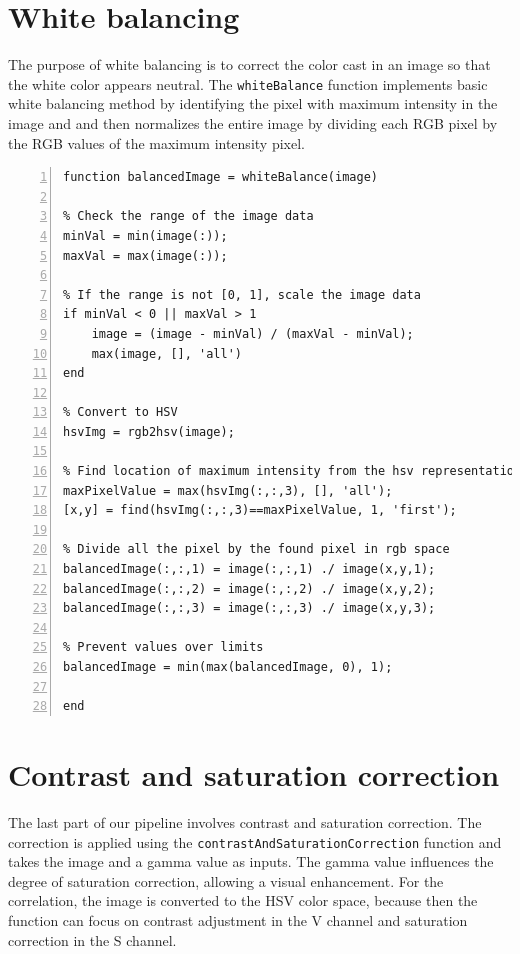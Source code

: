 \documentclass[12pt,a4paper,english
]{tunithesis}
\begin{document}
\section{White balancing}
The purpose of white balancing is to correct the color cast in an image so that the white color appears neutral. The \texttt{whiteBalance} function implements basic white balancing method by identifying the pixel with maximum intensity in the image and and then normalizes the entire image by dividing each RGB pixel by the RGB values of the maximum intensity pixel. 
\begin{lstlisting}[style=Matlab-editor, numbers=left, basicstyle=\small]
function balancedImage = whiteBalance(image)

% Check the range of the image data
minVal = min(image(:));
maxVal = max(image(:));

% If the range is not [0, 1], scale the image data
if minVal < 0 || maxVal > 1
    image = (image - minVal) / (maxVal - minVal);
    max(image, [], 'all')
end

% Convert to HSV
hsvImg = rgb2hsv(image);

% Find location of maximum intensity from the hsv representation
maxPixelValue = max(hsvImg(:,:,3), [], 'all');
[x,y] = find(hsvImg(:,:,3)==maxPixelValue, 1, 'first');

% Divide all the pixel by the found pixel in rgb space
balancedImage(:,:,1) = image(:,:,1) ./ image(x,y,1);
balancedImage(:,:,2) = image(:,:,2) ./ image(x,y,2);
balancedImage(:,:,3) = image(:,:,3) ./ image(x,y,3);

% Prevent values over limits
balancedImage = min(max(balancedImage, 0), 1);

end
\end{lstlisting}

\section{Contrast and saturation correction}
The last part of our pipeline involves contrast and saturation correction. The correction is applied using the \texttt{contrastAndSaturationCorrection} function and takes the image and a gamma value as inputs. The gamma value influences the degree of saturation correction, allowing a visual enhancement. For the correlation, the image is converted to the HSV color space, because then the function can focus on contrast adjustment in the V channel and saturation correction in the S channel.
\end{document}
